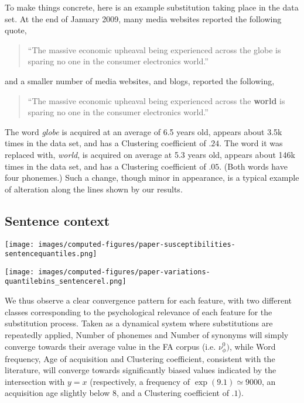 To make things concrete, here is an example substitution taking place in the data set.
At the end of January 2009, many media websites reported the following quote,

\begin{quote}
    ``The massive economic upheaval being experienced across the globe is sparing no one in the consumer electronics world.''
\end{quote}
and a smaller number of media websites, and blogs, reported the following,
\begin{quote}
    ``The massive economic upheaval being experienced across the \textbf{world} is sparing no one in the consumer electronics world.''
\end{quote}
The word \emph{globe} is acquired at an average of 6.5 years old, appears about 3.5k times in the data set, and has a Clustering coefficient of $.24$.
The word it was replaced with, \emph{world}, is acquired on average at 5.3 years old, appears about 146k times in the data set, and has a Clustering coefficient of $.05$. (Both words have four phonemes.)
Such a change, though minor in appearance, is a typical example of alteration along the lines shown by our results.


\subsection{Sentence context}


\begin{figure*}[!th]
    \centering
    \texttt{[image: images/computed-figures/paper-susceptibilities-sentencequantiles.png]}
    \caption{}
    \label{fig:feature-susceptibilities-in_sentence}
\end{figure*}

\begin{figure*}[!th]
    \centering
    \texttt{[image: images/computed-figures/paper-variations-quantilebins\_sentencerel.png]}
    \caption{}
    \label{fig:feature-variations-sentencerel}
\end{figure*}

\medskip
We thus observe a clear convergence pattern for each feature, with two different classes corresponding to the psychological relevance of each feature for the substitution process.
Taken as a dynamical system where substitutions are repeatedly applied, Number of phonemes and Number of synonyms will simply converge towards their average value in the FA corpus (i.e. $\nu_{\phi}^0)$, while Word frequency, Age of acquisition and Clustering coefficient, consistent with the literature, will converge towards significantly biased values indicated by the intersection with $y = x$ (respectively, a frequency of $\exp(9.1) \simeq 9000$, an acquisition age slightly below 8, and a Clustering coefficient of $.1$).

